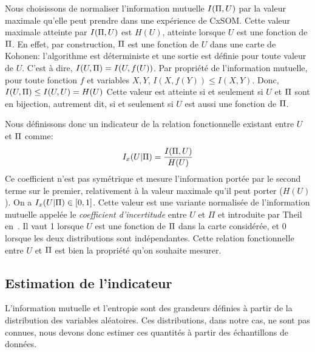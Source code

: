 \documentclass[../main]{subfiles}
\begin{document}
Nous choisissons de normaliser l'information mutuelle $I(\Pi,U)$  par la valeur maximale qu'elle peut prendre dans une expérience de CxSOM. Cette valeur maximale atteinte par $I(\Pi,U)$ est $H(U)$, atteinte lorsque $U$ est une fonction de $\Pi$.
En effet, par construction, $\Pi$ est une fonction de $U$ dans une carte de Kohonen: l'algorithme est déterministe et une sortie est définie pour toute valeur de $U$. C'est à dire, $I(U,\Pi) = I (U, f(U))$.
Par propriété de l'information mutuelle, pour toute fonction $f$ et variables $X,Y$, $I(X,f(Y)) \leq I(X,Y) $. 
Donc, $I(U,\Pi) \leq I(U,U) = H(U)$
Cette valeur est atteinte si et seulement si $U$ et $\Pi$ sont en bijection, autrement dit, si et seulement si $U$ est aussi une fonction de $\Pi$.

Nous définissons donc un indicateur de la relation fonctionnelle existant entre $U$ et $\Pi$ comme:
\begin{equation}
I_x(U|\Pi) = \frac{I(\Pi,U)}{H(U)}
\end{equation}
Ce coefficient n'est pas symétrique et mesure l'information portée par le second terme sur le premier, relativement à la valeur maximale qu'il peut porter ($H(U)$). On a $I_x(U|\Pi) \in [0,1]$. Cette valeur est une variante normalisée de l'information mutuelle appelée le \emph{coefficient d'incertitude} entre $U$ et $\Pi$ et introduite par Theil en~\cite{Theil1961EconomicFA}.
Il vaut 1 lorsque $U$ est une fonction de $\Pi$ dans la carte considérée, et $0$ lorsque les deux distributions sont indépendantes. Cette relation fonctionnelle entre $U$ et $\Pi$ est bien la propriété qu'on souhaite mesurer.



\subsection{Estimation de l'indicateur}

L'information mutuelle et l'entropie sont des grandeurs définies à partir de la distribution des variables aléatoires. Ces distributions, dans notre cas, ne sont pas connues, nous devons donc estimer ces quantités à partir des échantillons de données.
\end{document}
